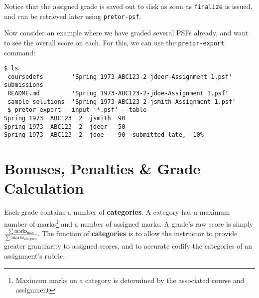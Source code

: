 \documentclass{book}
\begin{document}


Notice that the assigned grade is saved out to disk as soon as
\texttt{finalize} is issued, and can be retrieved later using
\texttt{pretor-psf}.

Now consider an example where we have graded several PSFs already, and want to
see the overall score on each. For this, we can use the \texttt{pretor-export}
command:

\begin{verbatim}
$ ls
 coursedefs        'Spring 1973-ABC123-2-jdeer-Assignment 1.psf'    submissions
 README.md         'Spring 1973-ABC123-2-jdoe-Assignment 1.psf'
 sample_solutions  'Spring 1973-ABC123-2-jsmith-Assignment 1.psf'
 $ pretor-export --input '*.psf' --table
Spring 1973  ABC123  2  jsmith  90
Spring 1973  ABC123  2  jdeer   50
Spring 1973  ABC123  2  jdoe    90  submitted late, -10%
\end{verbatim}

\section{Bonuses, Penalties \& Grade Calculation} \label{sec:grade_calculation}

Each grade contains a number of \textbf{categories}. A category has a maximum
number of marks\footnote{Maximum marks on a category is determined by the
associated course and assignment} and a number of assigned marks. A grade's raw
score is simply
$\frac{\sum\text{marks}_\text{max}}{\sum\text{marks}_\text{assigned}}$. The
function of \textbf{categories} is to allow the instructor to provide greater
granularity to assigned scores, and to accurate codify the categories of
an assignment's rubric.
\end{document}
